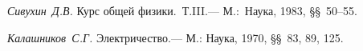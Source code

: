 \begin{lab:literature}
	\item~\emph{Сивухин~Д.В.} Курс общей физики.~Т.III.--- М.:~Наука, 1983, \S\S~50--55.
	
	\item~\emph{Калашников~С.Г.} Электричество.--- М.: Наука, 1970, \S\S~83, 89, 125.
\end{lab:literature}
